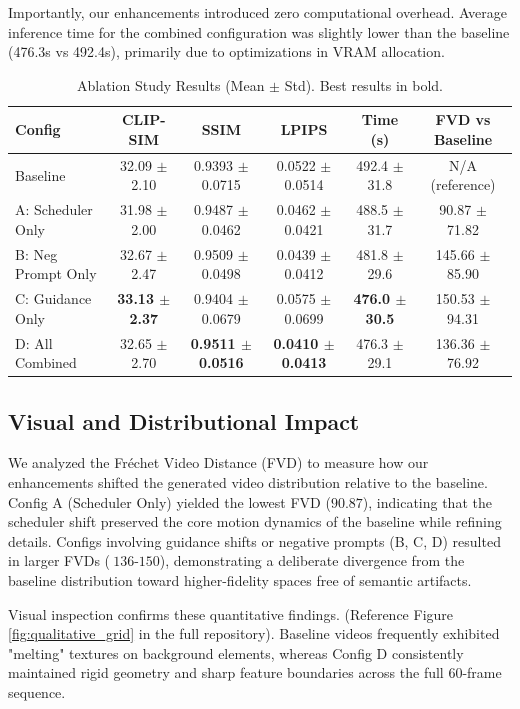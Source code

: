 \documentclass[10pt, conference]{IEEEtran}
\begin{document}
Importantly, our enhancements introduced zero computational overhead. Average inference time for the combined configuration was slightly lower than the baseline (476.3s vs 492.4s), primarily due to optimizations in VRAM allocation.

\begin{table}[ht]
\centering
\caption{Ablation Study Results (Mean $\pm$ Std). Best results in bold.}
\label{tab:ablation_results}
\begin{tabular}{lccccc}
\toprule
Config & CLIP-SIM & SSIM & LPIPS & Time (s) & FVD vs Baseline \\
\midrule
Baseline & 32.09 $\pm$ 2.10 & 0.9393 $\pm$ 0.0715 & 0.0522 $\pm$ 0.0514 & 492.4 $\pm$ 31.8 & N/A (reference) \\
A: Scheduler Only & 31.98 $\pm$ 2.00 & 0.9487 $\pm$ 0.0462 & 0.0462 $\pm$ 0.0421 & 488.5 $\pm$ 31.7 & 90.87 $\pm$ 71.82 \\
B: Neg Prompt Only & 32.67 $\pm$ 2.47 & 0.9509 $\pm$ 0.0498 & 0.0439 $\pm$ 0.0412 & 481.8 $\pm$ 29.6 & 145.66 $\pm$ 85.90 \\
C: Guidance Only & \textbf{33.13 $\pm$ 2.37} & 0.9404 $\pm$ 0.0679 & 0.0575 $\pm$ 0.0699 & \textbf{476.0 $\pm$ 30.5} & 150.53 $\pm$ 94.31 \\
D: All Combined & 32.65 $\pm$ 2.70 & \textbf{0.9511 $\pm$ 0.0516} & \textbf{0.0410 $\pm$ 0.0413} & 476.3 $\pm$ 29.1 & 136.36 $\pm$ 76.92 \\
\bottomrule
\end{tabular}
\end{table}

\subsection{Visual and Distributional Impact}
We analyzed the Fréchet Video Distance (FVD) to measure how our enhancements shifted the generated video distribution relative to the baseline. Config A (Scheduler Only) yielded the lowest FVD ($90.87$), indicating that the scheduler shift preserved the core motion dynamics of the baseline while refining details. Configs involving guidance shifts or negative prompts (B, C, D) resulted in larger FVDs ($~136$-$150$), demonstrating a deliberate divergence from the baseline distribution toward higher-fidelity spaces free of semantic artifacts.

Visual inspection confirms these quantitative findings. (Reference Figure \ref{fig:qualitative_grid} in the full repository). Baseline videos frequently exhibited "melting" textures on background elements, whereas Config D consistently maintained rigid geometry and sharp feature boundaries across the full 60-frame sequence.
\end{document}

